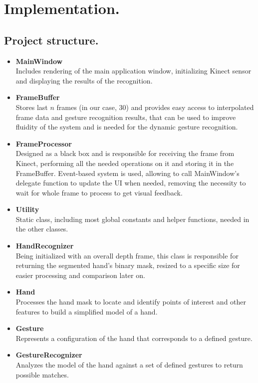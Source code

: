 \documentclass[a4paper,11pt,oneside]{article}
\begin{document}
 \section{Implementation.}

\subsection{Project structure.}

\begin{itemize}
\item \textbf{MainWindow}\\
Includes rendering of the main application window, initializing Kinect sensor and displaying the results of the recognition.

\item \textbf{FrameBuffer}\\
Stores last $n$ frames (in our case, 30) and provides easy access to interpolated frame data and gesture recognition results, that can be used to improve fluidity of the system and is needed for the dynamic gesture recognition.

\item \textbf{FrameProcessor}\\
Designed as a black box and is responsible for receiving the frame from Kinect, performing all the needed operations on it and storing it in the FrameBuffer. Event-based system is used, allowing to call MainWindow's delegate function to update the UI when needed, removing the necessity to wait for whole frame to process to get visual feedback.

\item \textbf{Utility}\\
Static class, including most global constants and helper functions, needed in the other classes.

\item \textbf{HandRecognizer}\\
Being initialized with an overall depth frame, this class is responsible for returning the segmented hand's binary mask, resized to a specific size for easier processing and comparison later on.

\item \textbf{Hand}\\
Processes the hand mask to locate and identify points of interest and other features to build a simplified model of a hand.

\item \textbf{Gesture}\\
Represents a configuration of the hand that corresponds to a defined gesture.

\item \textbf{GestureRecognizer}\\
Analyzes the model of the hand against a set of defined gestures to return possible matches.

\end{itemize}
\end{document}
